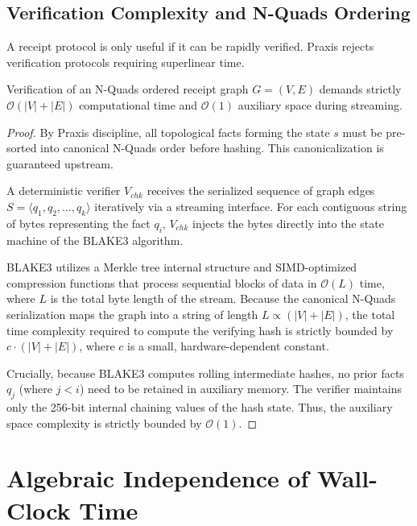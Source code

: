\subsection{Verification Complexity and N-Quads Ordering}

A receipt protocol is only useful if it can be rapidly verified. Praxis rejects verification protocols requiring superlinear time. 

\begin{lemma}
\label{lem:linear_verification}
Verification of an N-Quads ordered receipt graph $G = (V, E)$ demands strictly $\mathcal{O}(|V| + |E|)$ computational time and $\mathcal{O}(1)$ auxiliary space during streaming.
\end{lemma}

\begin{proof}
By Praxis discipline, all topological facts forming the state $s$ must be pre-sorted into canonical N-Quads order before hashing. This canonicalization is guaranteed upstream.

A deterministic verifier $V_{chk}$ receives the serialized sequence of graph edges $S = \langle q_1, q_2, \dots, q_k \rangle$ iteratively via a streaming interface. For each contiguous string of bytes representing the fact $q_i$, $V_{chk}$ injects the bytes directly into the state machine of the BLAKE3 algorithm. 

BLAKE3 utilizes a Merkle tree internal structure and SIMD-optimized compression functions that process sequential blocks of data in $\mathcal{O}(L)$ time, where $L$ is the total byte length of the stream. Because the canonical N-Quads serialization maps the graph into a string of length $L \propto (|V| + |E|)$, the total time complexity required to compute the verifying hash is strictly bounded by $c \cdot (|V| + |E|)$, where $c$ is a small, hardware-dependent constant.

Crucially, because BLAKE3 computes rolling intermediate hashes, no prior facts $q_j$ (where $j < i$) need to be retained in auxiliary memory. The verifier maintains only the 256-bit internal chaining values of the hash state. Thus, the auxiliary space complexity is strictly bounded by $\mathcal{O}(1)$.
\end{proof}

\section{Algebraic Independence of Wall-Clock Time}

